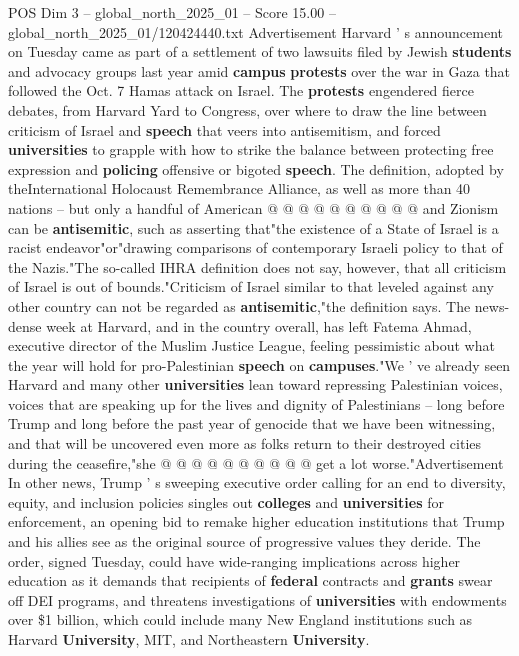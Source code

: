 \begin{textsample}{POS Dim 3 – global\_north\_2025\_01 – Score 15.00 – global\_north\_2025\_01/120424440.txt}
Advertisement Harvard ' s announcement on Tuesday came as part of a settlement of two lawsuits filed by Jewish \textbf{students} and advocacy groups last year amid \textbf{campus} \textbf{protests} over the war in Gaza that followed the Oct. 7 Hamas attack on Israel.
The \textbf{protests} engendered fierce debates, from Harvard Yard to Congress, over where to draw the line between criticism of Israel and \textbf{speech} that veers into antisemitism, and forced \textbf{universities} to grapple with how to strike the balance between protecting free expression and \textbf{policing} offensive or bigoted \textbf{speech}.
The definition, adopted by theInternational Holocaust Remembrance Alliance, as well as more than 40 nations -- but only a handful of American @ @ @ @ @ @ @ @ @ @ and Zionism can be \textbf{antisemitic}, such as asserting that"the existence of a State of Israel is a racist endeavor"or"drawing comparisons of contemporary Israeli policy to that of the Nazis."The so-called IHRA definition does not say, however, that all criticism of Israel is out of bounds."Criticism of Israel similar to that leveled against any other country can not be regarded as \textbf{antisemitic},"the definition says.
The news-dense week at Harvard, and in the country overall, has left Fatema Ahmad, executive director of the Muslim Justice League, feeling pessimistic about what the year will hold for pro-Palestinian \textbf{speech} on \textbf{campuses}."We ' ve already seen Harvard and many other \textbf{universities} lean toward repressing Palestinian voices, voices that are speaking up for the lives and dignity of Palestinians -- long before Trump and long before the past year of genocide that we have been witnessing, and that will be uncovered even more as folks return to their destroyed cities during the ceasefire,"she @ @ @ @ @ @ @ @ @ @ get a lot worse."Advertisement In other news, Trump ' s sweeping executive order calling for an end to diversity, equity, and inclusion policies singles out \textbf{colleges} and \textbf{universities} for enforcement, an opening bid to remake higher education institutions that Trump and his allies see as the original source of progressive values they deride.
The order, signed Tuesday, could have wide-ranging implications across higher education as it demands that recipients of \textbf{federal} contracts and \textbf{grants} swear off DEI programs, and threatens investigations of \textbf{universities} with endowments over \$1 billion, which could include many New England institutions such as Harvard \textbf{University}, MIT, and Northeastern \textbf{University}.

\end{textsample}
